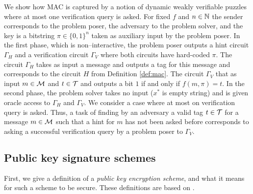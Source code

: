 We show how MAC is captured by a notion of dynamic weakly verifiable puzzles where at most one verification query is asked.
For fixed $f$ and $n \in \mathbb{N}$ the sender corresponds to the problem poser, the adversary to the problem solver,
and the key is a bitstring $\pi \in \{0,1\}^{n}$ taken as auxiliary input by the problem poser.
In the first phase, which is non--interactive, the problem poser outputs a hint circuit
$\Gamma_H$ and a verification circuit $\Gamma_V$ where both circuits have hard-coded $\pi$.
The circuit $\Gamma_H$ takes as input a message and outputs a tag for this message and corresponds to the circuit $H$ from Definition \ref{def:mac}.
The circuit $\Gamma_V$ that as input $m \in \mathcal{M}$ and $t \in \mathcal{T}$ and outputs a bit $1$ if and only if $f(m, \pi) = t$.
In the second phase, the problem solver takes no input ($x^*$ is empty string) and is given oracle access to $\Gamma_H$ and $\Gamma_V$.
We consider a case where at most on verification query is asked.
Thus, a task of finding by an adversary a valid tag $t \in \mathcal{T}$ for a message $m \in \mathcal{M}$ such that a hint for $m$ has not been asked before
corresponds to asking a successful verification query by a problem poser to $\Gamma_V$.
%
\subsection{Public key signature schemes}
First, we give a definition of a \textit{public key encryption scheme}, and what it means for such a scheme to be secure.
These definitions are based on \cite{Goldreich:2004:FCV:975541}.

